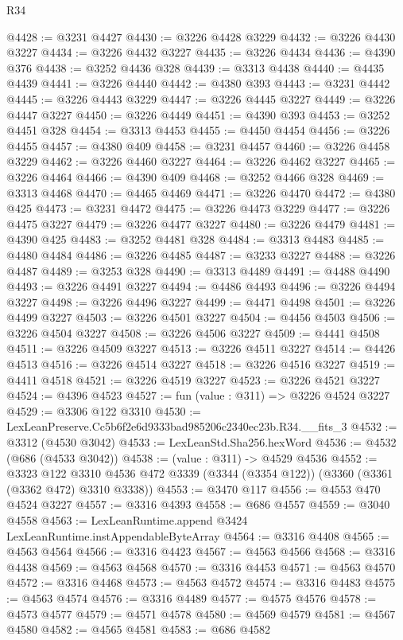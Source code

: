 \begin{lexlean}{R34}
\begin{coremodule}
@4428 := @3231 @4427
@4430 := @3226 @4428 @3229
@4432 := @3226 @4430 @3227
@4434 := @3226 @4432 @3227
@4435 := @3226 @4434
@4436 := @4390 @376
@4438 := @3252 @4436 @328
@4439 := @3313 @4438
@4440 := @4435 @4439
@4441 := @3226 @4440
@4442 := @4380 @393
@4443 := @3231 @4442
@4445 := @3226 @4443 @3229
@4447 := @3226 @4445 @3227
@4449 := @3226 @4447 @3227
@4450 := @3226 @4449
@4451 := @4390 @393
@4453 := @3252 @4451 @328
@4454 := @3313 @4453
@4455 := @4450 @4454
@4456 := @3226 @4455
@4457 := @4380 @409
@4458 := @3231 @4457
@4460 := @3226 @4458 @3229
@4462 := @3226 @4460 @3227
@4464 := @3226 @4462 @3227
@4465 := @3226 @4464
@4466 := @4390 @409
@4468 := @3252 @4466 @328
@4469 := @3313 @4468
@4470 := @4465 @4469
@4471 := @3226 @4470
@4472 := @4380 @425
@4473 := @3231 @4472
@4475 := @3226 @4473 @3229
@4477 := @3226 @4475 @3227
@4479 := @3226 @4477 @3227
@4480 := @3226 @4479
@4481 := @4390 @425
@4483 := @3252 @4481 @328
@4484 := @3313 @4483
@4485 := @4480 @4484
@4486 := @3226 @4485
@4487 := @3233 @3227
@4488 := @3226 @4487
@4489 := @3253 @328
@4490 := @3313 @4489
@4491 := @4488 @4490
@4493 := @3226 @4491 @3227
@4494 := @4486 @4493
@4496 := @3226 @4494 @3227
@4498 := @3226 @4496 @3227
@4499 := @4471 @4498
@4501 := @3226 @4499 @3227
@4503 := @3226 @4501 @3227
@4504 := @4456 @4503
@4506 := @3226 @4504 @3227
@4508 := @3226 @4506 @3227
@4509 := @4441 @4508
@4511 := @3226 @4509 @3227
@4513 := @3226 @4511 @3227
@4514 := @4426 @4513
@4516 := @3226 @4514 @3227
@4518 := @3226 @4516 @3227
@4519 := @4411 @4518
@4521 := @3226 @4519 @3227
@4523 := @3226 @4521 @3227
@4524 := @4396 @4523
@4527 := fun (value : @311) => @3226 @4524 @3227
@4529 := @3306 @122 @3310
@4530 := LexLeanPreserve.Cc5b6f2e6d9333bad985206c2340ec23b.R34.__fits_3
@4532 := @3312 (@4530 @3042)
@4533 := LexLeanStd.Sha256.hexWord
@4536 := @4532 (@686 (@4533 @3042))
@4538 := (value : @311) -> @4529 @4536
@4552 := @3323
    @122
    @3310
    @4536
    @472
    @3339
    (@3344 (@3354 @122))
    (@3360 (@3361 (@3362 @472) @3310 @3338))
@4553 := @3470 @117
@4556 := @4553 @470 @4524 @3227
@4557 := @3316 @4393
@4558 := @686 @4557
@4559 := @3040 @4558
@4563 := LexLeanRuntime.append @3424 LexLeanRuntime.instAppendableByteArray
@4564 := @3316 @4408
@4565 := @4563 @4564
@4566 := @3316 @4423
@4567 := @4563 @4566
@4568 := @3316 @4438
@4569 := @4563 @4568
@4570 := @3316 @4453
@4571 := @4563 @4570
@4572 := @3316 @4468
@4573 := @4563 @4572
@4574 := @3316 @4483
@4575 := @4563 @4574
@4576 := @3316 @4489
@4577 := @4575 @4576
@4578 := @4573 @4577
@4579 := @4571 @4578
@4580 := @4569 @4579
@4581 := @4567 @4580
@4582 := @4565 @4581
@4583 := @686 @4582

\end{coremodule}
\end{lexlean}
